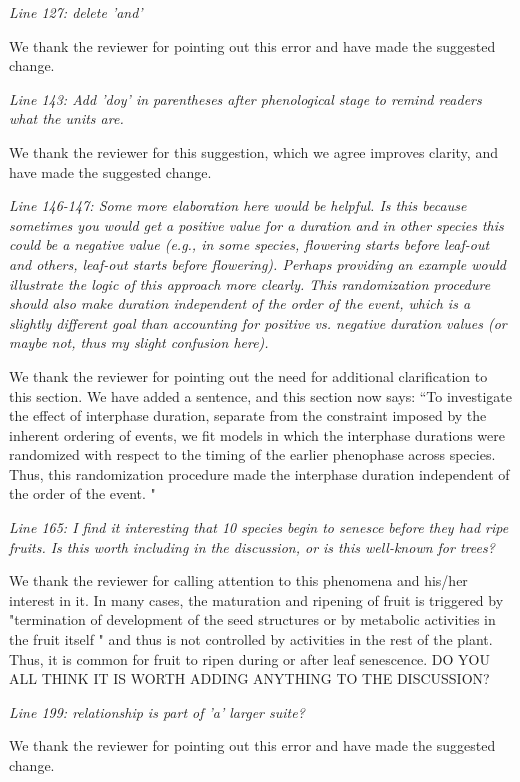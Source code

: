 \documentclass[10.95pt,a4paper]{letter}
\begin{document}
\par \emph{Line 127: delete 'and'}
\par We thank the reviewer for pointing out this error and have made the suggested change. 

\par \emph{Line 143: Add 'doy' in parentheses after phenological stage to remind readers what the units are.} 
\par We thank the reviewer for this suggestion, which we agree improves clarity, and have made the suggested change. 

\par \emph{Line 146-147: Some more elaboration here would be helpful.  Is this because sometimes you would get a positive value for a duration and in other species this could be a negative value (e.g., in some species, flowering starts before leaf-out and others, leaf-out starts before flowering).  Perhaps providing an example would illustrate the logic of this approach more clearly.  This randomization procedure should also make duration independent of the order of the event, which is a slightly different goal than accounting for positive vs. negative duration values (or maybe not, thus my slight confusion here).}
\par We thank the reviewer for pointing out the need for additional clarification to this section. We have added a sentence, and this section now says:
``To investigate the effect of interphase duration, separate from the constraint imposed by the inherent ordering of events, we fit models in which the interphase durations were randomized with respect to the timing of the earlier phenophase across species. Thus, this randomization procedure made the interphase duration independent of the order of the event. "
\par \emph{Line 165: I find it interesting that 10 species begin to senesce before they had ripe fruits. Is this worth including in the discussion, or is this well-known for trees?} 
\par We thank the reviewer for calling attention to this phenomena and his/her interest in it. In many cases, the maturation and ripening of fruit is triggered by "termination of development of the seed structures or by metabolic activities in the fruit itself " and thus is not controlled by activities in the rest of the plant. Thus, it is common for fruit to ripen during or after leaf senescence. DO YOU ALL THINK IT  IS WORTH ADDING ANYTHING TO THE DISCUSSION?
\par \emph{Line 199: relationship is part of 'a' larger suite?}
\par We thank the reviewer for pointing out this error and have made the suggested change. 
\end{document}

